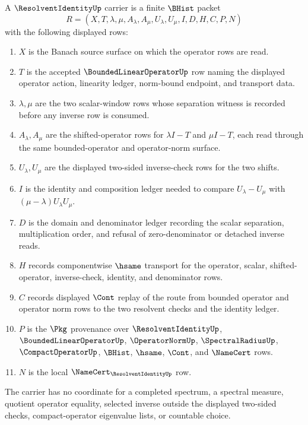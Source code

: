 \begin{definition}
\label{def:resolvent-identity-carrier}
A $\ResolventIdentityUp$ carrier is a finite $\BHist$ packet
$$
R=(X,T,\lambda,\mu,A_\lambda,A_\mu,U_\lambda,U_\mu,I,D,H,C,P,N)
$$
with the following displayed rows:
\begin{enumerate}
\item $X$ is the Banach source surface on which the operator rows are read.
\item $T$ is the accepted $\BoundedLinearOperatorUp$ row naming the displayed operator action, linearity ledger, norm-bound endpoint, and transport data.
\item $\lambda,\mu$ are the two scalar-window rows whose separation witness is recorded before any inverse row is consumed.
\item $A_\lambda,A_\mu$ are the shifted-operator rows for $\lambda I-T$ and $\mu I-T$, each read through the same bounded-operator and operator-norm surface.
\item $U_\lambda,U_\mu$ are the displayed two-sided inverse-check rows for the two shifts.
\item $I$ is the identity and composition ledger needed to compare $U_\lambda-U_\mu$ with $(\mu-\lambda)U_\lambda U_\mu$.
\item $D$ is the domain and denominator ledger recording the scalar separation, multiplication order, and refusal of zero-denominator or detached inverse reads.
\item $H$ records componentwise $\hsame$ transport for the operator, scalar, shifted-operator, inverse-check, identity, and denominator rows.
\item $C$ records displayed $\Cont$ replay of the route from bounded operator and operator norm rows to the two resolvent checks and the identity ledger.
\item $P$ is the $\Pkg$ provenance over $\ResolventIdentityUp$, $\BoundedLinearOperatorUp$, $\OperatorNormUp$, $\SpectralRadiusUp$, $\CompactOperatorUp$, $\BHist$, $\hsame$, $\Cont$, and $\NameCert$ rows.
\item $N$ is the local $\NameCert_{\ResolventIdentityUp}$ row.
\end{enumerate}
The carrier has no coordinate for a completed spectrum, a spectral measure, quotient operator equality, selected inverse outside the displayed two-sided checks, compact-operator eigenvalue lists, or countable choice.
\end{definition}


